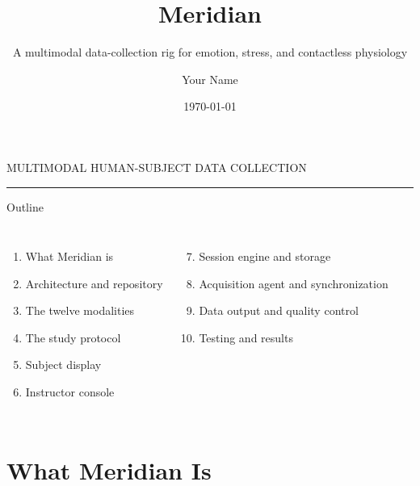 \documentclass[aspectratio=169,11pt]{beamer}
\title{Meridian}
\subtitle{A multimodal data-collection rig for emotion, stress, and contactless physiology}
\author{Your Name}
\institute{IIT Ropar}
\date{\today}
\begin{document}
\begin{frame}[plain]
  \vfill
  {\color{clay}\small MULTIMODAL HUMAN-SUBJECT DATA COLLECTION}\par\vspace{0.6em}
  {\inserttitle}\par\vspace{0.3em}
  {\Large{}\insertsubtitle}\par\vspace{1.2em}
  {\color{clay}\rule{3em}{2pt}}\par\vspace{1em}
  {\normalsize\insertauthor\quad\textbar\quad\insertinstitute\quad\textbar\quad\insertdate}\par
  \vfill
\end{frame}

\begin{frame}{Outline}
  \begin{columns}[T]
    \begin{enumerate}
      \item What Meridian is
      \item Architecture and repository
      \item The twelve modalities
      \item The study protocol
      \item Subject display
      \item Instructor console
    \end{enumerate}
    \begin{enumerate}\setcounter{enumi}{6}
      \item Session engine and storage
      \item Acquisition agent and synchronization
      \item Data output and quality control
      \item Testing and results
    \end{enumerate}
  \end{columns}
\end{frame}

\section{What Meridian Is}
\end{document}
